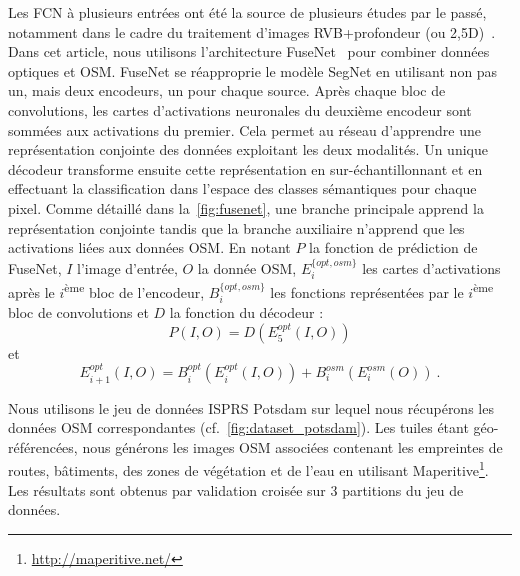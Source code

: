 Les FCN à plusieurs entrées ont été la source de plusieurs études par le passé, notamment dans le cadre du traitement d'images RVB+profondeur (ou 2,5D)~\cite{eitel_multimodal_2015}. Dans cet article, nous utilisons l'architecture FuseNet~\cite{hazirbas_fusenet_2016} pour combiner données optiques et OSM. FuseNet se réapproprie le modèle SegNet en utilisant non pas un, mais deux encodeurs, un pour chaque source. Après chaque bloc de convolutions, les cartes d'activations neuronales du deuxième encodeur sont sommées aux activations du premier. Cela permet au réseau d'apprendre une représentation conjointe des données exploitant les deux modalités. Un unique décodeur transforme ensuite cette représentation en sur-échantillonnant et en effectuant la classification dans l'espace des classes sémantiques pour chaque pixel. Comme détaillé dans la~\cref{fig:fusenet}, une branche principale apprend la représentation conjointe tandis que la branche auxiliaire n'apprend que les activations liées aux données OSM. En notant $P$ la fonction de prédiction de FuseNet, $I$ l'image d'entrée, $O$ la donnée OSM, $E_i^{\{opt,osm\}}$ les cartes d'activations après le $i$\textsuperscript{ème} bloc de l'encodeur, $B_i^{\{opt,osm\}}$ les fonctions représentées par le $i$\textsuperscript{ème} bloc de convolutions et $D$ la fonction du décodeur :
\begin{equation}
P(I,O) = D(E_5^{opt}(I,O))
\end{equation}
et
\begin{equation}
E_{i+1}^{opt}(I,O) = B_i^{opt}(E_i^{opt}(I, O)) + B_i^{osm}(E_i^{osm}(O))~.
\end{equation}

Nous utilisons le jeu de données \gls{ISPRS} Potsdam sur lequel nous récupérons les données \gls{OSM} correspondantes (cf.~\cref{fig:dataset_potsdam}). Les tuiles étant géo-référencées, nous générons les images OSM associées contenant les empreintes de routes, bâtiments, des zones de végétation et de l'eau en utilisant Maperitive\footnote{\url{http://maperitive.net/}}. Les résultats sont obtenus par validation croisée sur 3 partitions du jeu de données.


